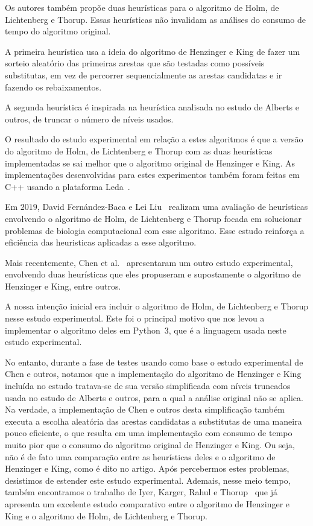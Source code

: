 Os autores também propõe duas heurísticas para o algoritmo de Holm, de Lichtenberg e Thorup. Essas heurísticas não invalidam as análises do consumo de tempo do algoritmo original.

A primeira heurística usa a ideia do algoritmo de Henzinger e King de fazer um sorteio aleatório das primeiras arestas que são testadas como possíveis substitutas, em vez de percorrer sequencialmente as arestas candidatas e ir fazendo os rebaixamentos.

A segunda heurística é inspirada na heurística analisada no estudo de Alberts e outros, de truncar o número de níveis usados.

O resultado do estudo experimental em relação a estes algoritmos é que a versão do algoritmo de Holm, de Lichtenberg e Thorup com as duas heurísticas implementadas se sai melhor que o algoritmo original de Henzinger e King.
As implementações desenvolvidas para estes experimentos também foram feitas em C++ usando a plataforma Leda~\cite{LEDA}.


Em $2019$, David Fernández-Baca e Lei Liu~\cite{xp-Phylogeny} realizam uma avaliação de heurísticas envolvendo o algoritmo de Holm, de Lichtenberg e Thorup focada em solucionar problemas de biologia computacional com esse algoritmo.
Esse estudo reinforça a eficiência das heuristicas aplicadas a esse algoritmo.


Mais recentemente, Chen et al.~\cite{QC22} apresentaram um outro estudo experimental, envolvendo duas heurísticas que eles propuseram e supostamente o algoritmo de Henzinger e King, entre outros.

A nossa intenção inicial era incluir o algoritmo de Holm, de Lichtenberg e Thorup nesse estudo experimental. Este foi o principal motivo que nos levou a implementar o algoritmo deles em Python~3, que é a linguagem usada neste estudo experimental.

No entanto, durante a fase de testes usando como base o estudo experimental de Chen e outros, notamos que a implementação do algoritmo de Henzinger e King incluída no estudo tratava-se de sua versão simplificada com níveis truncados usada no estudo de Alberts e outros, para a qual a análise original não se aplica.
Na verdade, a implementação de Chen e outros desta simplificação também executa a escolha aleatória das arestas candidatas a substitutas de uma maneira pouco eficiente, o que resulta em uma implementação com consumo de tempo muito pior que o consumo do algoritmo original de Henzinger e King.
Ou seja, não é de fato uma comparação entre as heurísticas deles e o algoritmo de Henzinger e King, como é dito no artigo.
Após percebermos estes problemas, desistimos de estender este estudo experimental.
Ademais, nesse meio tempo, também encontramos o trabalho de Iyer, Karger, Rahul e Thorup~\cite{EmpiricalStudy2002} que já apresenta um excelente estudo comparativo entre o algoritmo de Henzinger e King e o algoritmo de Holm, de Lichtenberg e Thorup. 
